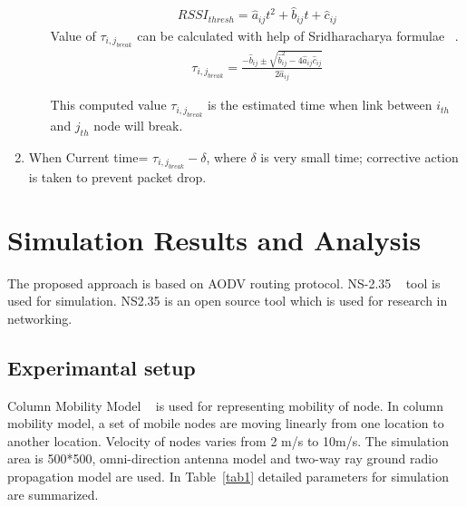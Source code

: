 \documentclass[runningheads]{llncs}
\begin{document}
\begin{enumerate}
\begin{itemize}
\begin{equation}
\begin{aligned}
			RSSI_{thresh} = \hat{a}_{ij} t^{2} + \hat{b}_{ij}t + \hat{c}_{ij}
			\end{aligned}\label{eq:ten}
			\end{equation}    
			Value of $\tau_{i,j_{break}}$ can be calculated with help of Sridharacharya formulae ~\cite{r13}.
			\begin{equation}%
			\begin{aligned}
			\tau_{i,j_{break}} =\frac{-\hat{b}_{ij} \pm \sqrt{\hat{b}_{ij}^{2}-4\hat{a}_{ij}\hat{c}_{ij}}}{2\hat{a}_{ij}}
			\end{aligned}\label{eq:eleven}
			\end{equation}            
			
			This computed value $\tau_{i,j_{break}}$ is the estimated time when link between $i_{th}$ and $j_{th}$ node will break.  
		\end{itemize}
		\item When Current time= $\tau_{i,j_{break}}- \delta$,  where $\delta$ is very small time; corrective action is taken to prevent packet drop.    
		
		
	\end{enumerate}
	
	
	
	
	
	\section{ Simulation Results and Analysis}
	The proposed approach is based on AODV routing protocol. NS-2.35 ~\cite{r14} tool is used for simulation. NS2.35 is an open source tool which is used for research in networking. 
	
	\subsection{Experimantal setup}
	Column Mobility Model ~\cite{r15} is used for representing mobility of node. In column mobility model, a set of mobile nodes are moving linearly from one location to another location. Velocity of nodes varies from 2 m/s to 10m/s. The simulation area is 500*500, omni-direction antenna model and two-way ray ground radio propagation model are used. In Table~\ref{tab1} detailed parameters for simulation are summarized.
	
\end{document}
